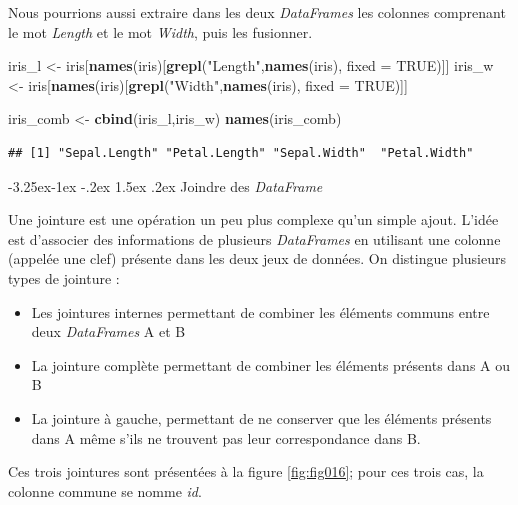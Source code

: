 \documentclass[
  11pt,
  french,
]{book}
\makeatletter
\newenvironment{Shaded}{\begin{snugshade}}{\end{snugshade}}
\newcommand{\DataTypeTok}[1]{\textcolor[rgb]{0.13,0.29,0.53}{#1}}
\newcommand{\KeywordTok}[1]{\textcolor[rgb]{0.13,0.29,0.53}{\textbf{#1}}}
\newcommand{\NormalTok}[1]{#1}
\newcommand{\OtherTok}[1]{\textcolor[rgb]{0.56,0.35,0.01}{#1}}
\newcommand{\StringTok}[1]{\textcolor[rgb]{0.31,0.60,0.02}{#1}}
\providecommand{\tightlist}{%
  \setlength{\itemsep}{0pt}\setlength{\parskip}{0pt}}
\newenvironment{kframe}{%
\medskip{}
\setlength{\fboxsep}{.8em}
 \def\at@end@of@kframe{}%
 \ifinner\ifhmode%
  \def\at@end@of@kframe{\end{minipage}}%
  \begin{minipage}{\columnwidth}%
 \fi\fi%
 \def\FrameCommand##1{\hskip\@totalleftmargin \hskip-\fboxsep
 \colorbox{shadecolor}{##1}\hskip-\fboxsep
     \hskip-\linewidth \hskip-\@totalleftmargin \hskip\columnwidth}%
 \MakeFramed {\advance\hsize-\width
   \@totalleftmargin\z@ \linewidth\hsize
   \@setminipage}}%
 {\par\unskip\endMakeFramed%
 \at@end@of@kframe}
\renewenvironment{Shaded}{\begin{kframe}}{\end{kframe}}
\renewcommand\paragraph{\@startsection{paragraph}{4}{\z@}%
   {-3.25ex\@plus -1ex \@minus -.2ex}%
   {1.5ex \@plus .2ex}%
   {\normalfont\normalsize\bfseries}}
\makeatother
\begin{document}
Nous pourrions aussi extraire dans les deux \emph{DataFrames} les colonnes comprenant le mot \emph{Length} et le mot \emph{Width}, puis les fusionner.

\begin{Shaded}
\begin{Highlighting}[]
\NormalTok{iris_l <-}\StringTok{ }\NormalTok{iris[}\KeywordTok{names}\NormalTok{(iris)[}\KeywordTok{grepl}\NormalTok{(}\StringTok{"Length"}\NormalTok{,}\KeywordTok{names}\NormalTok{(iris), }\DataTypeTok{fixed =} \OtherTok{TRUE}\NormalTok{)]]}
\NormalTok{iris_w <-}\StringTok{ }\NormalTok{iris[}\KeywordTok{names}\NormalTok{(iris)[}\KeywordTok{grepl}\NormalTok{(}\StringTok{"Width"}\NormalTok{,}\KeywordTok{names}\NormalTok{(iris), }\DataTypeTok{fixed =} \OtherTok{TRUE}\NormalTok{)]]}

\NormalTok{iris_comb <-}\StringTok{ }\KeywordTok{cbind}\NormalTok{(iris_l,iris_w)}
\KeywordTok{names}\NormalTok{(iris_comb)}
\end{Highlighting}
\end{Shaded}

\begin{verbatim}
## [1] "Sepal.Length" "Petal.Length" "Sepal.Width"  "Petal.Width"
\end{verbatim}

\hypertarget{sect014292}{%
\paragraph{\texorpdfstring{Joindre des \emph{DataFrame}}{Joindre des DataFrame}}\label{sect014292}}

Une jointure est une opération un peu plus complexe qu'un simple ajout. L'idée est d'associer des informations de plusieurs \emph{DataFrames} en utilisant une colonne (appelée une clef) présente dans les deux jeux de données. On distingue plusieurs types de jointure :

\begin{itemize}
\tightlist
\item
  Les jointures internes permettant de combiner les éléments communs entre deux \emph{DataFrames} A et B
\item
  La jointure complète permettant de combiner les éléments présents dans A ou B
\item
  La jointure à gauche, permettant de ne conserver que les éléments présents dans A même s'ils ne trouvent pas leur correspondance dans B.
\end{itemize}

Ces trois jointures sont présentées à la figure \ref{fig:fig016}; pour ces trois cas, la colonne commune se nomme \emph{id}.
\end{document}
